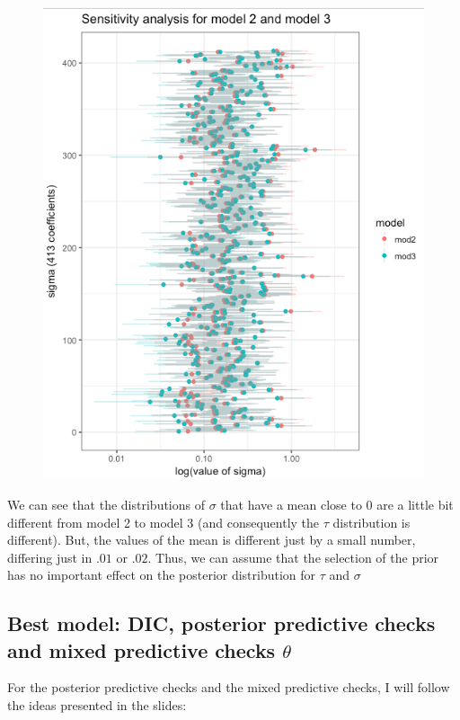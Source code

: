 \documentclass{article}
\begin{document}
\begin{figure}[ht!]
\centering
\includegraphics[width=15cm]{figures/model3_sensitivity2.png}
\end{figure}

\newpage
We can see that the distributions of $\sigma$ that have a mean close to 0 are a little bit different from model 2 to model 3 (and consequently the $\tau$ distribution is different). But, the values of the mean is different just by a small number, differing just in $.01$ or $.02$. Thus, we can assume that the selection of the prior has no important effect on the posterior distribution for $\tau$ and $\sigma$

\newpage
\subsection*{Best model: DIC, posterior predictive checks and mixed predictive checks $\theta$}

For the posterior predictive checks and the mixed predictive checks, I will follow the ideas presented in the slides:
\end{document}

